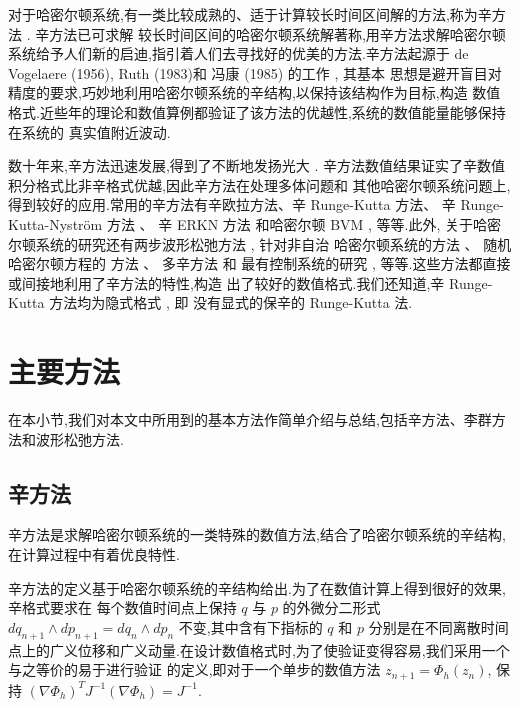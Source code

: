 对于哈密尔顿系统,有一类比较成熟的、适于计算较长时间区间解的方法,称为辛方法 \cite{feng2010symplectic}. 辛方法已可求解
较长时间区间的哈密尔顿系统解著称,用辛方法求解哈密尔顿系统给予人们新的启迪,指引着人们去寻找好的优美的方法.辛方法起源于
de Vogelaere (1956), Ruth (1983)和 冯康 (1985) 的工作 \cite{hairer2006geometric}, 其基本
思想是避开盲目对精度的要求,巧妙地利用哈密尔顿系统的辛结构,以保持该结构作为目标,构造
数值格式.近些年的理论和数值算例都验证了该方法的优越性,系统的数值能量能够保持在系统的
真实值附近波动.

数十年来,辛方法迅速发展,得到了不断地发扬光大 \cite{calvo1994numerical,leimkuhler2004simulating,hong2006multi,yang2009extended,monovasilis2013exponentially,xin2016birkhoffian,michalas2016numerical,liao2016multi}. 辛方法数值结果证实了辛数值积分格式比非辛格式优越,因此辛方法在处理多体问题和
其他哈密尔顿系统问题上,得到较好的应用.常用的辛方法有辛欧拉方法、辛 Runge-Kutta 方法、
辛 Runge-Kutta-Nystr{\"o}m 方法 \cite{kalogiratou2014fourth,kalogiratou2015}、 辛 ERKN
方法 \cite{wang2014ahigh} 和哈密尔顿 BVM \cite{brugnano2014multi}, 等等.此外,
关于哈密尔顿系统的研究还有两步波形松弛方法 \cite{hassanzadeh2014two}, 针对非自治
哈密尔顿系统的方法 \cite{hong2000numerical,zhang2010anote}、 随机哈密尔顿方程的
方法 \cite{burrage2014structure,ma2015sto,fan2015using}、 多辛方法 \cite{wang2013multi} 和
最有控制系统的研究 \cite{li2015asym}, 等等.这些方法都直接或间接地利用了辛方法的特性,构造
出了较好的数值格式.我们还知道,辛 Runge-Kutta 方法均为隐式格式 \cite{sanz1988runge}, 即
没有显式的保辛的 Runge-Kutta 法.

\section{主要方法}
在本小节,我们对本文中所用到的基本方法作简单介绍与总结,包括辛方法、李群方法和波形松弛方法.

\subsection{辛方法}

辛方法是求解哈密尔顿系统的一类特殊的数值方法,结合了哈密尔顿系统的辛结构,在计算过程中有着优良特性.

辛方法的定义基于哈密尔顿系统的辛结构给出.为了在数值计算上得到很好的效果,辛格式要求在
每个数值时间点上保持 $q$ 与 $p$ 的外微分二形式 $dq_{n+1}\wedge dp_{n+1}=dq_n\wedge dp_n$ 不变,其中含有下指标的 $q$ 和 $p$
分别是在不同离散时间点上的广义位移和广义动量.在设计数值格式时,为了使验证变得容易,我们采用一个与之等价的易于进行验证
的定义,即对于一个单步的数值方法 $z_{n+1}=\Phi_h(z_n)$, 保持 $(\nabla\Phi_h)^TJ^{-1}(\nabla\Phi_h)=J^{-1}$.

